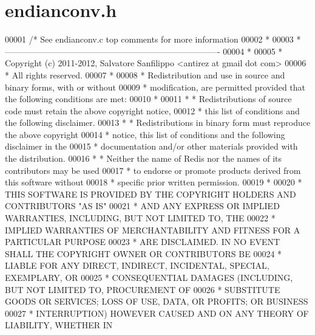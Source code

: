 \hypertarget{endianconv_8h_source}{}\section{endianconv.\+h}
\label{endianconv_8h_source}

\begin{DoxyCode}
00001 \textcolor{comment}{/* See endianconv.c top comments for more information}
00002 \textcolor{comment}{ *}
00003 \textcolor{comment}{ * ----------------------------------------------------------------------------}
00004 \textcolor{comment}{ *}
00005 \textcolor{comment}{ * Copyright (c) 2011-2012, Salvatore Sanfilippo <antirez at gmail dot com>}
00006 \textcolor{comment}{ * All rights reserved.}
00007 \textcolor{comment}{ *}
00008 \textcolor{comment}{ * Redistribution and use in source and binary forms, with or without}
00009 \textcolor{comment}{ * modification, are permitted provided that the following conditions are met:}
00010 \textcolor{comment}{ *}
00011 \textcolor{comment}{ *   * Redistributions of source code must retain the above copyright notice,}
00012 \textcolor{comment}{ *     this list of conditions and the following disclaimer.}
00013 \textcolor{comment}{ *   * Redistributions in binary form must reproduce the above copyright}
00014 \textcolor{comment}{ *     notice, this list of conditions and the following disclaimer in the}
00015 \textcolor{comment}{ *     documentation and/or other materials provided with the distribution.}
00016 \textcolor{comment}{ *   * Neither the name of Redis nor the names of its contributors may be used}
00017 \textcolor{comment}{ *     to endorse or promote products derived from this software without}
00018 \textcolor{comment}{ *     specific prior written permission.}
00019 \textcolor{comment}{ *}
00020 \textcolor{comment}{ * THIS SOFTWARE IS PROVIDED BY THE COPYRIGHT HOLDERS AND CONTRIBUTORS "AS IS"}
00021 \textcolor{comment}{ * AND ANY EXPRESS OR IMPLIED WARRANTIES, INCLUDING, BUT NOT LIMITED TO, THE}
00022 \textcolor{comment}{ * IMPLIED WARRANTIES OF MERCHANTABILITY AND FITNESS FOR A PARTICULAR PURPOSE}
00023 \textcolor{comment}{ * ARE DISCLAIMED. IN NO EVENT SHALL THE COPYRIGHT OWNER OR CONTRIBUTORS BE}
00024 \textcolor{comment}{ * LIABLE FOR ANY DIRECT, INDIRECT, INCIDENTAL, SPECIAL, EXEMPLARY, OR}
00025 \textcolor{comment}{ * CONSEQUENTIAL DAMAGES (INCLUDING, BUT NOT LIMITED TO, PROCUREMENT OF}
00026 \textcolor{comment}{ * SUBSTITUTE GOODS OR SERVICES; LOSS OF USE, DATA, OR PROFITS; OR BUSINESS}
00027 \textcolor{comment}{ * INTERRUPTION) HOWEVER CAUSED AND ON ANY THEORY OF LIABILITY, WHETHER IN}

\end{DoxyCode}
